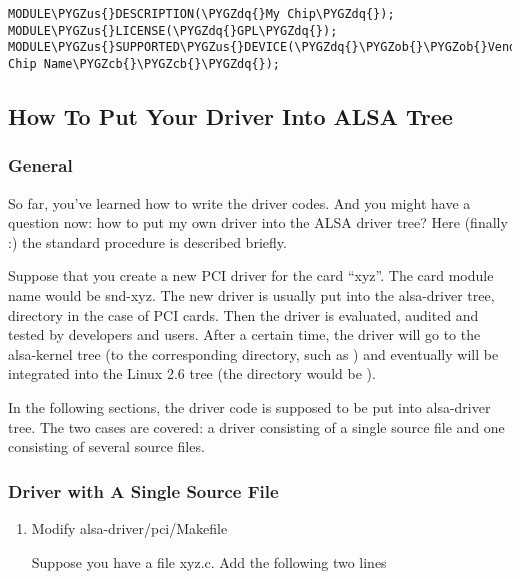 \documentclass[a4paper,8pt,english]{sphinxmanual}
\def\PYGZus{\char`\_}
\def\PYGZob{\char`\{}
\def\PYGZcb{\char`\}}
\def\PYGZdq{\char`\"}
\begin{document}
\begin{Verbatim}[commandchars=\\\{\}]
MODULE\PYGZus{}DESCRIPTION(\PYGZdq{}My Chip\PYGZdq{});
MODULE\PYGZus{}LICENSE(\PYGZdq{}GPL\PYGZdq{});
MODULE\PYGZus{}SUPPORTED\PYGZus{}DEVICE(\PYGZdq{}\PYGZob{}\PYGZob{}Vendor,My Chip Name\PYGZcb{}\PYGZcb{}\PYGZdq{});
\end{Verbatim}


\subsection{How To Put Your Driver Into ALSA Tree}
\label{sound/kernel-api/writing-an-alsa-driver:how-to-put-your-driver-into-alsa-tree}

\subsubsection{General}
\label{sound/kernel-api/writing-an-alsa-driver:id8}
So far, you've learned how to write the driver codes. And you might have
a question now: how to put my own driver into the ALSA driver tree? Here
(finally :) the standard procedure is described briefly.

Suppose that you create a new PCI driver for the card “xyz”. The card
module name would be snd-xyz. The new driver is usually put into the
alsa-driver tree,  directory in the case of PCI
cards. Then the driver is evaluated, audited and tested by developers
and users. After a certain time, the driver will go to the alsa-kernel
tree (to the corresponding directory, such as ) and
eventually will be integrated into the Linux 2.6 tree (the directory
would be ).

In the following sections, the driver code is supposed to be put into
alsa-driver tree. The two cases are covered: a driver consisting of a
single source file and one consisting of several source files.


\subsubsection{Driver with A Single Source File}
\label{sound/kernel-api/writing-an-alsa-driver:driver-with-a-single-source-file}\begin{enumerate}
\item {} 
Modify alsa-driver/pci/Makefile

Suppose you have a file xyz.c. Add the following two lines

\end{enumerate}
\end{document}
